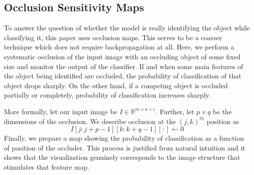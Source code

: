 \subsection{Occlusion Sensitivity Maps}
To answer the question of whether the model is really identifying the object while classifying it, this \cite{occlusion} paper uses occlusion maps. This serves to be a coarser technique which does not require backpropagation at all. Here, we perform a systematic occlusion of the input image with an occluding object of some fixed size and monitor the output of the classifier. If and when some main features of the object being identified are occluded, the probability of classification of that object drops sharply. On the other hand, if a competing object is occluded partially or completely, probability of classification increases sharply.

More formally, let our input image be $I \in \mathbb{R}^{m \times n \times c}$. Further, let $p \times q$ be the dimensions of the occlusion. We describe occlusion at the $(j,k)^{th}$ position as
\[I[j:j+p-1][k:k+q-1][:] \leftarrow 0\]
Finally, we prepare a map showing the probability of classification as a function of position of the occluder. This process is justified from natural intuition and it shows
that the visualization genuinely corresponds to the image structure that stimulates that feature map.